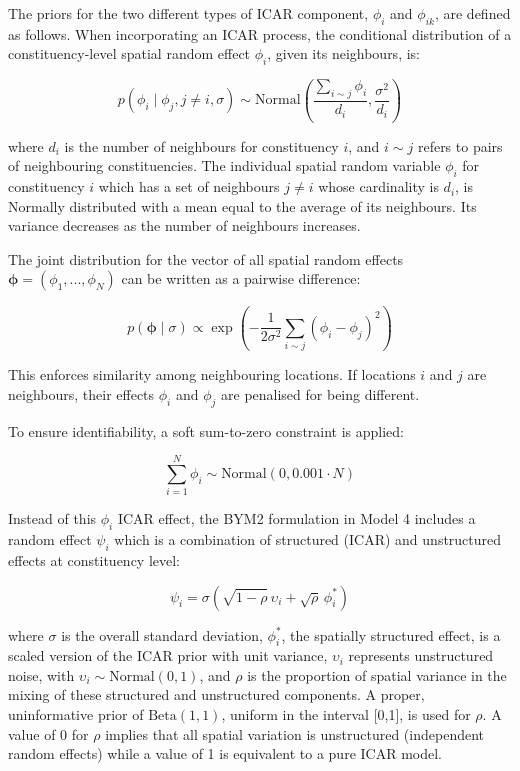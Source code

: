 \documentclass[webpdf,large,contemporary,namedate]{oup-authoring-template}
\theoremstyle{thmstyleone}
\theoremstyle{thmstyletwo}
\theoremstyle{thmstylethree}
\begin{document}
The priors for the two different types of ICAR component, \(\phi_i\) and
\(\phi_{ik}\), are defined as follows. When incorporating an ICAR
process, the conditional distribution of a constituency-level spatial
random effect \(\phi_i\), given its neighbours, is:

\[
p(\phi_i \mid \phi_j, {j \neq i}, \sigma) \sim \text{Normal}\left( \frac{\sum_{i \sim j} \phi_i} {d_i}, \frac{\sigma^2}{d_i} \right)
\]

where \(d_i\) is the number of neighbours for constituency \(i\), and
\(i \sim j\) refers to pairs of neighbouring constituencies. The
individual spatial random variable \(\phi_i\) for constituency \(i\)
which has a set of neighbours \(j \neq i\) whose cardinality is \(d_i\),
is Normally distributed with a mean equal to the average of its
neighbours. Its variance decreases as the number of neighbours
increases.

The joint distribution for the vector of all spatial random effects
\(\boldsymbol{\phi} = (\phi_1,...,\phi_N)\) can be written as a pairwise
difference:

\[
p(\boldsymbol{\phi} \mid \sigma) \propto \exp \left( -\frac{1}{2\sigma^2} \sum_{i \sim j} (\phi_i - \phi_j)^2 \right)
\]

This enforces similarity among neighbouring locations. If locations
\(i\) and \(j\) are neighbours, their effects \(\phi_i\) and \(\phi_j\)
are penalised for being different.

To ensure identifiability, a soft sum-to-zero constraint is applied:

\[
\sum_{i=1}^N \phi_i \sim \text{Normal}(0, 0.001 \cdot N)
\]

Instead of this \(\phi_i\) ICAR effect, the BYM2 formulation in Model 4
includes a random effect \(\psi_i\) which is a combination of structured
(ICAR) and unstructured effects at constituency level:

\[
\psi_i = \sigma(\sqrt{1-\rho} \, \upsilon_i + \sqrt{\rho} \, \phi_i^*)
\]

where \(\sigma\) is the overall standard deviation, \(\phi_i^*\), the
spatially structured effect, is a scaled version of the ICAR prior with
unit variance, \(\upsilon_i\) represents unstructured noise, with
\(\upsilon_i \sim \text{Normal}(0, 1)\), and \(\rho\) is the proportion
of spatial variance in the mixing of these structured and unstructured
components. A proper, uninformative prior of \(\text{Beta}(1,1)\),
uniform in the interval {[}0,1{]}, is used for \(\rho\). A value of 0
for \(\rho\) implies that all spatial variation is unstructured
(independent random effects) while a value of 1 is equivalent to a pure
ICAR model.
\end{document}

